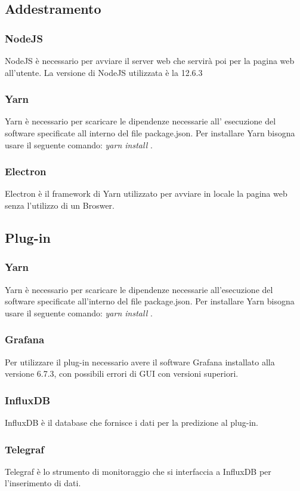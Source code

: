 \documentclass[../manuale-sviluppatore.tex]{subfiles}
\begin{document}
\subsection{Addestramento}%
\label{subs:addestramento}

\subsubsection{NodeJS}
\label{sssec:nodejs}
     NodeJS è necessario per avviare il server web che servirà poi per la pagina web all'utente. La versione di NodeJS utilizzata è la 12.6.3 

\subsubsection{Yarn}
\label{sssec:yarn}
    Yarn è necessario per scaricare le dipendenze necessarie all' esecuzione del software specificate all interno del file package.json. Per installare Yarn bisogna usare il seguente comando: \emph{yarn install} .
    
\subsubsection{Electron}
\label{sssec:electron}
    Electron è il framework di Yarn utilizzato per avviare in locale la pagina web senza l'utilizzo di un Broswer.
     
\subsection{Plug-in}%
\label{subs:plug_in}

\subsubsection{Yarn}
\label{sssec:yarn}
    Yarn è necessario per scaricare le dipendenze necessarie all'esecuzione del software specificate all'interno del file package.json. Per installare Yarn bisogna usare il seguente comando: \emph{yarn install} .
    
\subsubsection{Grafana}
\label{sssec:grafana}
    Per utilizzare il plug-in necessario avere il software Grafana installato alla versione 6.7.3, con possibili errori di GUI con versioni superiori.
    
\subsubsection{InfluxDB}
\label{sssec:influxdb}
    InfluxDB è il database che fornisce i dati per la predizione al plug-in.
    
\subsubsection{Telegraf}
\label{sssec:telegraf}
    Telegraf è lo strumento di monitoraggio che si interfaccia a InfluxDB per l'inserimento di dati.
\end{document}
